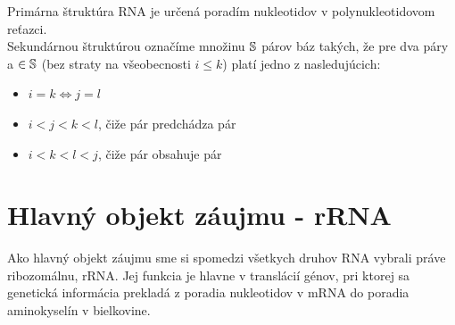 \begin{definice}
  \label{def:RNA_primarna_struktura}
  Primárna štruktúra RNA je určená poradím nukleotidov v polynukleotidovom reťazci.
  \\
  Sekundárnou štruktúrou označíme množinu $\mathbb{S}$ párov báz  takých,
  že pre dva páry  a  $\in \mathbb{S}$ (bez straty na všeobecnosti $i \leq k$)
  platí jedno z nasledujúcich:
  \begin{itemize}
    \item $i = k \iff j = l$
    \item $i < j < k < l$, čiže pár  predchádza pár 
    \item $i < k < l < j$, čiže pár  obsahuje pár 
  \end{itemize}
\end{definice}

\section{Hlavný objekt záujmu - rRNA}

Ako hlavný objekt záujmu sme si spomedzi všetkych druhov RNA vybrali práve ribozomálnu, rRNA.
Jej funkcia je hlavne v translácií génov, pri ktorej sa genetická informácia prekladá
z poradia nukleotidov v mRNA do poradia aminokyselín v bielkovine.

